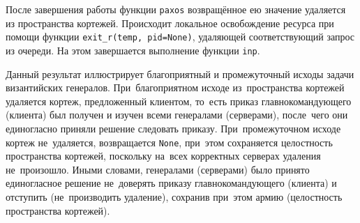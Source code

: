 После завершения работы функции \texttt{paxos} возвращённое ею значение удаляется из пространства кортежей. Происходит локальное освобождение ресурса при помощи функции \texttt{exit_r(temp, pid=None)}, удаляющей соответствующий запрос из очереди. На этом завершается выполнение функции \texttt{inp}.





Данный результат иллюстрирует благоприятный и промежуточный исходы задачи византийских генералов. При~благоприятном исходе из~пространства кортежей удаляется кортеж, предложенный клиентом, то~есть приказ главнокомандующего (клиента) был получен и изучен всеми генералами (серверами), после~чего они единогласно приняли решение следовать приказу. При~промежуточном исходе кортеж не~удаляется, возвращается \texttt{None}, при~этом сохраняется целостность пространства кортежей, поскольку на~всех корректных серверах удаления не~произошло. Иными словами, генералами (серверами) было принято единогласное решение не~доверять приказу главнокомандующего (клиента) и отступить (не~производить удаление), сохранив при~этом армию (целостность пространства кортежей).



\Conc

\printbibliography[heading=bibintoc]

\appendix
{}
